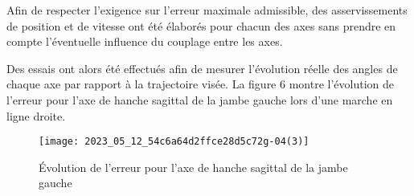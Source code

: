 Afin de respecter l'exigence sur l'erreur maximale admissible, des asservissements de position et de vitesse ont été élaborés pour chacun des axes sans prendre en compte l'éventuelle influence du couplage entre les axes.

Des essais ont alors été effectués afin de mesurer l'évolution réelle des angles de chaque axe par rapport à la trajectoire visée. La figure 6 montre l'évolution de l'erreur pour l'axe de hanche sagittal de la jambe gauche lors d'une marche en ligne droite.

\ifprof
\begin{corrige}
\end{corrige}
\else
\fi



\begin{figure}[!h]
\texttt{[image: 2023\_05\_12\_54c6a64d2ffce28d5c72g-04(3)]}
\caption{Évolution de l'erreur pour l'axe de hanche sagittal de la jambe gauche}
\end{figure}



